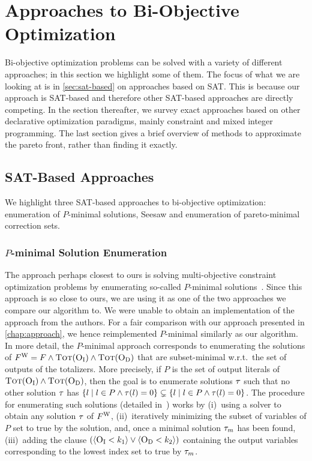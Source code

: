 \section{Approaches to Bi-Objective Optimization\label{sec:approaches}}

Bi-objective optimization problems can be solved with a variety of different approaches;
in this section we highlight some of them.
The focus of what we are looking at is in \cref{sec:sat-based} on approaches based on SAT.
This is because our approach is SAT-based and therefore other SAT-based approaches are directly competing.
In the section thereafter, we survey exact approaches based on other declarative optimization paradigms, mainly constraint and mixed integer programming.
The last section gives a brief overview of methods to approximate the pareto front, rather than finding it exactly.

\subsection{SAT-Based Approaches\label{sec:sat-based}}

We highlight three SAT-based approaches to bi-objective optimization:
enumeration of $P$-minimal solutions, Seesaw and enumeration of pareto-minimal correction sets.

\subsubsection{$P$-minimal Solution Enumeration\label{sec:p-minimal}}

The approach perhaps closest to ours is solving multi-objective constraint optimization problems by enumerating so-called $P$-minimal solutions~\autocite{DBLP:conf/cp/SohBTB17,DBLP:conf/ftp/KoshimuraNFH09}.
Since this approach is so close to ours, we are using it as one of the two approaches we compare our algorithm to.
We were unable to obtain an implementation of the approach from the authors.
For a fair comparison with our approach presented in \cref{chap:approach}, we hence reimplemented $P$-minimal similarly as our algorithm.
In more detail, the $P$-minimal approach  corresponds to enumerating the solutions of $F^\text{W} = F \land \textsc{Tot}(\textsc{O}_{\text{I}}) \land \textsc{Tot}(\textsc{O}_{\text{D}})$ that are subset-minimal w.r.t.\ the set of outputs of the totalizers.
More precisely, if $P$ is the set of output literals of $\textsc{Tot}(\textsc{O}_{\text{I}}) \land \textsc{Tot}(\textsc{O}_{\text{D}})$, then the goal is to enumerate solutions $\tau$ such that no other solution $\tau$ has $\{ l \mid l \in P \land \tau(l) = 0\} \subsetneq \{ l \mid l \in P \land \tau(l) = 0\}$.
The procedure for enumerating such solutions (detailed in~\textcite{DBLP:conf/ftp/KoshimuraNFH09}) works by (i)~using a solver to obtain any solution $\tau$ of $F^\text{W}$, (ii)~iteratively minimizing the subset of variables of $P$ set to true by the solution, and, once a minimal solution $\tau_m$ has been found, (iii)~adding the clause $(\langle \textsc{O}_{\text{I}} < k_1 \rangle \lor \langle \textsc{O}_{\text{D}} < k_2 \rangle)$ containing the output variables corresponding to the lowest index set to true by $\tau_m$.

